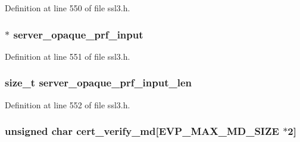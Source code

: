 Definition at line 550 of file ssl3.\+h.

\subsubsection[{\texorpdfstring{server\+\_\+opaque\+\_\+prf\+\_\+input}{server_opaque_prf_input}}]{ $\ast$ server\+\_\+opaque\+\_\+prf\+\_\+input}\hypertarget{structssl3__state__st_ac0eb8f7a69df226fc0ea3e84238511e4}{}\label{structssl3__state__st_ac0eb8f7a69df226fc0ea3e84238511e4}


Definition at line 551 of file ssl3.\+h.

\subsubsection[{\texorpdfstring{server\+\_\+opaque\+\_\+prf\+\_\+input\+\_\+len}{server_opaque_prf_input_len}}]{\setlength{\rightskip}{0pt plus 5cm}size\+\_\+t server\+\_\+opaque\+\_\+prf\+\_\+input\+\_\+len}\hypertarget{structssl3__state__st_a72f80b3d92f496e924b36217ca22958d}{}\label{structssl3__state__st_a72f80b3d92f496e924b36217ca22958d}


Definition at line 552 of file ssl3.\+h.

\subsubsection[{\texorpdfstring{cert\+\_\+verify\+\_\+md}{cert_verify_md}}]{\setlength{\rightskip}{0pt plus 5cm}unsigned char cert\+\_\+verify\+\_\+md\mbox{[}{\bf E\+V\+P\+\_\+\+M\+A\+X\+\_\+\+M\+D\+\_\+\+S\+I\+ZE} $\ast$2\mbox{]}}\hypertarget{structssl3__state__st_ac58d45d751e6687c540d670d319034ad}{}\label{structssl3__state__st_ac58d45d751e6687c540d670d319034ad}


